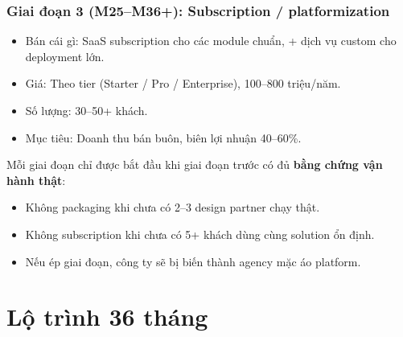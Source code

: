 \documentclass[11pt,a4paper]{article}
\begin{document}
\subsubsection*{Giai đoạn 3 (M25--M36+): Subscription / platformization}

\begin{itemize}
\item Bán cái gì: SaaS subscription cho các module chuẩn, + dịch vụ custom cho deployment lớn.
\item Giá: Theo tier (Starter / Pro / Enterprise), 100--800 triệu/năm.
\item Số lượng: 30--50+ khách.
\item Mục tiêu: Doanh thu bán buôn, biên lợi nhuận 40--60\%.
\end{itemize}

\begin{warnbox}[title=Không leo giai đoạn quá sớm]
Mỗi giai đoạn chỉ được bắt đầu khi giai đoạn trước có đủ \textbf{bằng chứng vận hành thật}:
\begin{itemize}
\item Không packaging khi chưa có 2--3 design partner chạy thật.
\item Không subscription khi chưa có 5+ khách dùng cùng solution ổn định.
\item Nếu ép giai đoạn, công ty sẽ bị biến thành agency mặc áo platform.
\end{itemize}
\end{warnbox}

\clearpage

\section{Lộ trình 36 tháng}
\end{document}
